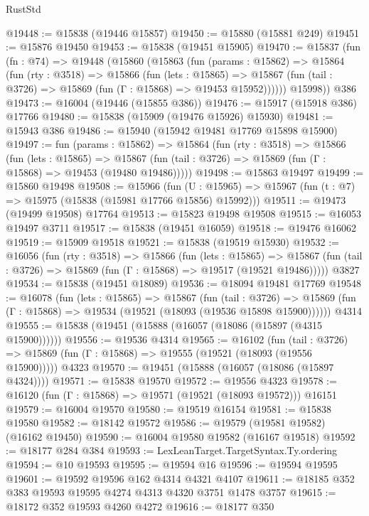 \begin{lexlean}{RustStd}
\begin{coremodule}
@19448 := @15838 (@19446 @15857)
@19450 := @15880 (@15881 @249)
@19451 := @15876 @19450
@19453 := @15838 (@19451 @15905)
@19470 := @15837
    (fun (fn : @74) =>
    @19448
      (@15860
        (@15863
          (fun (params : @15862) =>
          @15864
            (fun (rty : @3518) =>
            @15866
              (fun (lets : @15865) =>
              @15867 (fun (tail : @3726) => @15869 (fun (Γ : @15868) => @19453 @15952))))))
        @15998))
    @386
@19473 := @16004 (@19446 (@15855 @386))
@19476 := @15917 (@15918 @386) @17766
@19480 := @15838 (@15909 (@19476 @15926) @15930)
@19481 := @15943 @386
@19486 := @15940 (@15942 @19481 @17769 @15898 @15900)
@19497 := fun (params : @15862) =>
  @15864
    (fun (rty : @3518) =>
    @15866
      (fun (lets : @15865) =>
      @15867 (fun (tail : @3726) => @15869 (fun (Γ : @15868) => @19453 (@19480 @19486)))))
@19498 := @15863 @19497
@19499 := @15860 @19498
@19508 := @15966
    (fun (U : @15965) => @15967 (fun (t : @7) => @15975 (@15838 (@15981 @17766 @15856) @15992)))
@19511 := @19473 (@19499 @19508) @17764
@19513 := @15823 @19498 @19508
@19515 := @16053 @19497 @3711
@19517 := @15838 (@19451 @16059)
@19518 := @19476 @16062
@19519 := @15909 @19518
@19521 := @15838 (@19519 @15930)
@19532 := @16056
    (fun (rty : @3518) =>
    @15866
      (fun (lets : @15865) =>
      @15867 (fun (tail : @3726) => @15869 (fun (Γ : @15868) => @19517 (@19521 @19486)))))
    @3827
@19534 := @15838 (@19451 @18089)
@19536 := @18094 @19481 @17769
@19548 := @16078
    (fun (lets : @15865) =>
    @15867
      (fun (tail : @3726) =>
      @15869 (fun (Γ : @15868) => @19534 (@19521 (@18093 (@19536 @15898 @15900))))))
    @4314
@19555 := @15838 (@19451 (@15888 (@16057 (@18086 (@15897 (@4315 @15900))))))
@19556 := @19536 @4314
@19565 := @16102
    (fun (tail : @3726) => @15869 (fun (Γ : @15868) => @19555 (@19521 (@18093 (@19556 @15900)))))
    @4323
@19570 := @19451 (@15888 (@16057 (@18086 (@15897 @4324))))
@19571 := @15838 @19570
@19572 := @19556 @4323
@19578 := @16120 (fun (Γ : @15868) => @19571 (@19521 (@18093 @19572))) @16151
@19579 := @16004 @19570
@19580 := @19519 @16154
@19581 := @15838 @19580
@19582 := @18142 @19572
@19586 := @19579 (@19581 @19582) (@16162 @19450)
@19590 := @16004 @19580 @19582 (@16167 @19518)
@19592 := @18177 @284 @384
@19593 := LexLeanTarget.TargetSyntax.Ty.ordering
@19594 := @10 @19593
@19595 := @19594 @16
@19596 := @19594 @19595
@19601 := @19592 @19596 @162 @4314 @4321 @4107
@19611 := @18185 @352 @383 @19593 @19595 @4274 @4313 @4320 @3751 @1478 @3757
@19615 := @18172 @352 @19593 @4260 @4272
@19616 := @18177 @350

\end{coremodule}
\end{lexlean}
